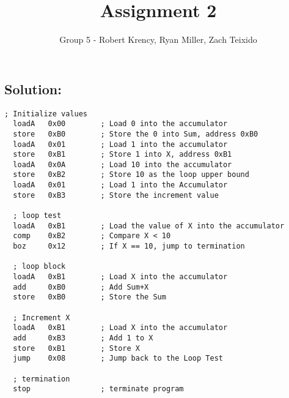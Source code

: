 \documentclass[12pt]{article}
\title{Assignment 2}
\author{Group 5 - Robert Krency, Ryan Miller, Zach Teixido}
\date{}
\begin{document}
\maketitle

\subsection*{Solution:}

\begin{lstlisting}[style=customasm]
  ; Initialize values
  loadA   0x00        ; Load 0 into the accumulator
  store   0xB0        ; Store the 0 into Sum, address 0xB0
  loadA   0x01        ; Load 1 into the accumulator
  store   0xB1        ; Store 1 into X, address 0xB1
  loadA   0x0A        ; Load 10 into the accumulator
  store   0xB2        ; Store 10 as the loop upper bound
  loadA   0x01        ; Load 1 into the Accumulator
  store   0xB3        ; Store the increment value

  ; loop test
  loadA   0xB1        ; Load the value of X into the accumulator
  comp    0xB2        ; Compare X < 10
  boz     0x12        ; If X == 10, jump to termination

  ; loop block
  loadA   0xB1        ; Load X into the accumulator
  add     0xB0        ; Add Sum+X
  store   0xB0        ; Store the Sum

  ; Increment X
  loadA   0xB1        ; Load X into the accumulator
  add     0xB3        ; Add 1 to X
  store   0xB1        ; Store X
  jump    0x08        ; Jump back to the Loop Test

  ; termination
  stop                ; terminate program
\end{lstlisting}
\end{document}
